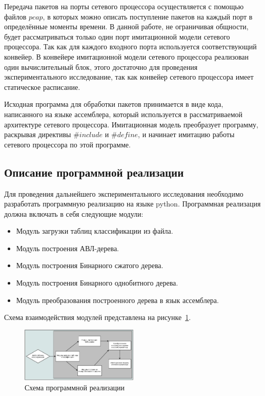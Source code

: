 \documentclass[conference]{IEEEtran}
\begin{document}
        Передача пакетов на порты сетевого процессора осуществляется с помощью файлов $pcap$, в которых можно описать поступление пакетов на каждый порт в определённые моменты времени.
        В данной работе, не ограничивая общности, будет рассматриваться только один порт имитационной модели сетевого процессора. Так как для каждого входного
        порта используется соответствующий конвейер. В конвейере имитационной модели сетевого процессора реализован один вычислительный блок, этого достаточно для проведения 
        экспериментального исследование, так как конвейер сетевого процессора имеет статическое расписание.

        Исходная программа для обработки пакетов принимается в виде кода, написанного на языке ассемблера, который используется в рассматриваемой архитектуре сетевого процессора.
        Имитационная модель преобразует программу, раскрывая директивы $\#include$ и $\#define$, и начинает имитацию работы сетевого процессора по этой программе.
        
        
    \subsection{Описание программной реализации}
        Для проведения дальнейшего экспериментального исследования необходимо разработать программную реализацию на языке python. Программная реализация должна включать в себя
        следующие модули:
        
        \begin{itemize}
            \item Модуль загрузки таблиц классификации из файла.
            \item Модуль построения АВЛ-дерева.
            \item Модуль построения Бинарного сжатого дерева.
            \item Модуль построения Бинарного однобитного дерева.
            \item Модуль преобразования построенного дерева в язык ассемблера.
        \end{itemize}
        Схема взаимодействия модулей представлена на рисунке~\ref{fig:mesh5}.
       
        \begin{figure}[ht]
            \centering
            \includegraphics[width=0.5\textwidth]{program_scheme.jpg}
            \caption{Схема программной реализации}\label{fig:mesh5}
        \end{figure}        
\end{document}
